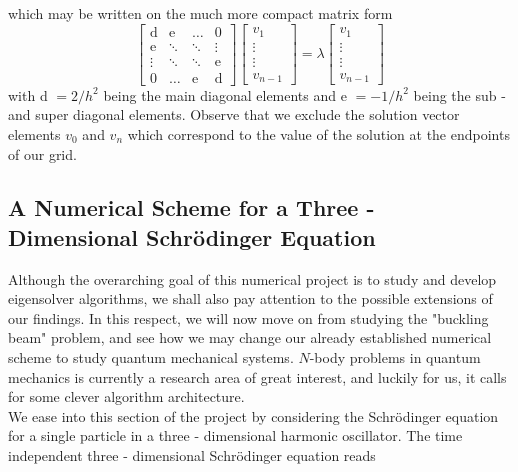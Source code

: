 	which may be written on the much more compact matrix form
	\begin{equation}
		\begin{bmatrix}
		\text{d} & \text{e} & \hdots & 0\\
		\text{e} & \ddots & \ddots & \vdots \\
		\vdots & \ddots & \ddots & \text{e} \\
		0 &\hdots & \text{e} & \text{d}
		\end{bmatrix}
		\begin{bmatrix}
		v_1\\ \vdots \\ \vdots \\ v_{n-1}
		\end{bmatrix}
		= 
		\lambda
		\begin{bmatrix}
		v_1\\ \vdots \\ \vdots \\ v_{n-1}
		\end{bmatrix}
	\end{equation}
	with d $= 2/h^2$ being the main diagonal elements and e $ = -1/h^2$ being the sub - and super diagonal elements. Observe that we exclude the solution vector elements $v_0$ and $v_n$ which correspond to the value of the solution at the endpoints of our grid. %
	
	\subsection{A Numerical Scheme for a Three - Dimensional Schrödinger Equation}
	Although the overarching goal of this numerical project is to study and develop eigensolver algorithms, we shall also pay attention to the possible extensions of our findings. In this respect, we will now move on from studying the "buckling beam" problem, and see how we may change our already established numerical scheme to study quantum mechanical systems. $N$-body problems in quantum mechanics is currently a research area of great interest, and luckily for us, it calls for some clever algorithm architecture.\\
	
	We ease into this section of the project by considering the Schrödinger equation for a single particle in a three - dimensional harmonic oscillator. The time independent three - dimensional Schrödinger equation reads
	
